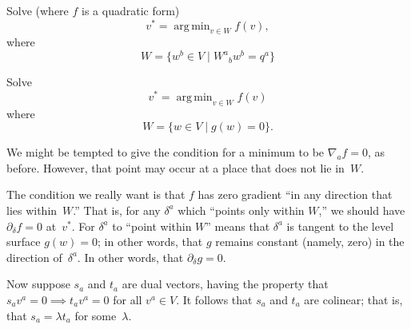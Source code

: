 \documentclass[10pt, a4paper]{article}
\DeclareMathOperator*{\argmin}{arg\,min}
\begin{document}
Solve (where $f$ is a quadratic form)
\begin{equation*}
    \label{eq:linear-constraint}
    v^* = \argmin_{v\in W} f(v), 
\end{equation*}
where
\begin{equation*}
    W=\{w^b \in V \mid W^a{}_b w^b = q^a\}
\end{equation*}



Solve
\begin{equation*}
    \label{eq:linear-constraint}
    v^* = \argmin_{v\in W} f(v)
\end{equation*}
where
\begin{equation*}
   W=\{w \in V \mid g(w) = 0\}.
\end{equation*}

We might be tempted to give the condition for a minimum to be
$\nabla_a f=0$, as before. However, that point may occur at a place that
does not lie in~$W$. 


The condition we really want is that $f$ has zero
gradient ``in any direction that lies within~$W$.'' That is, for any
$\delta^a$ which ``points only within $W$,'' we should have
$\partial_\delta f = 0$ at~$v^*$. For $\delta^a$ to ``point within
$W$'' means that $\delta^a$ is tangent to the level surface
$g(w) = 0$; in other words, that $g$ remains constant (namely, zero)
in the direction of~$\delta^a$. In other words, that
$\partial_\delta g = 0$. 

Now suppose $s_a$ and $t_a$ are dual vectors, having the property that
$s_av^a = 0 \implies t_av^a=0$ for all $v^a\in V$. It follows that
$s_a$ and $t_a$ are colinear; that is, that $s_a=\lambda t_a$ for some~$\lambda$. 












\end{document}
